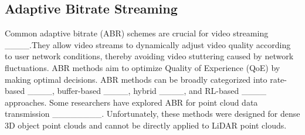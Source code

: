 \subsection{Adaptive Bitrate Streaming}
Common adaptive bitrate (ABR) schemes are crucial 
for video streaming ____.They allow 
video streams to dynamically adjust video quality 
according to user network conditions, thereby 
avoiding video stuttering caused by network 
fluctuations. 
ABR methods aim to optimize Quality of Experience (QoE) 
by making optimal decisions. 
ABR methods can be broadly categorized 
into rate-based ____, 
buffer-based ____, hybrid ____, and 
RL-based ____ approaches.
Some researchers have explored ABR 
for point cloud data transmission 
________. 
Unfortunately, these methods were designed for 
dense 3D object point clouds and cannot be directly 
applied to LiDAR point clouds.
